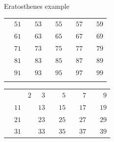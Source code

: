 \documentclass{beamer}
\begin{document}
\begin{frame}[plain]{Eratosthenes example}
{\begin{tabular}{r r r r r r r r r r}
			                   & \color{black} $51$ &                    & \color{black} $53$ &                    & \color{black} $55$ &                    & \color{black} $57$ &                    & \color{black} $59$\\
			                   & \color{black} $61$ &                    & \color{black} $63$ &                    & \color{black} $65$ &                    & \color{black} $67$ &                    & \color{black} $69$\\
			                   & \color{black} $71$ &                    & \color{black} $73$ &                    & \color{black} $75$ &                    & \color{black} $77$ &                    & \color{black} $79$\\
			                   & \color{black} $81$ &                    & \color{black} $83$ &                    & \color{black} $85$ &                    & \color{black} $87$ &                    & \color{black} $89$\\
			                   & \color{black} $91$ &                    & \color{black} $93$ &                    & \color{black} $95$ &                    & \color{black} $97$ &                    & \color{black} $99$\\
			\phantom{$888$} & \phantom{$888$} & \phantom{$888$} & \phantom{$888$} & \phantom{$888$} & \phantom{$888$} & \phantom{$888$} & \phantom{$888$} & \phantom{$888$} & \phantom{$888$}
        \end{tabular}
	}
	 {
		\begin{tabular}{r r r r r r r r r r}
			                   &                    & \color{black}  $2$ & \color{ blue}  $3$ &                    & \color{black}  $5$ &                    & \color{black}  $7$ &                    & \color{  red}  $9$\\
			                   & \color{black} $11$ &                    & \color{black} $13$ &                    & \color{  red} $15$ &                    & \color{black} $17$ &                    & \color{black} $19$\\
			                   & \color{  red} $21$ &                    & \color{black} $23$ &                    & \color{black} $25$ &                    & \color{  red} $27$ &                    & \color{black} $29$\\
			                   & \color{black} $31$ &                    & \color{  red} $33$ &                    & \color{black} $35$ &                    & \color{black} $37$ &                    & \color{  red} $39$\\

\end{tabular}}
\end{frame}
\end{document}
